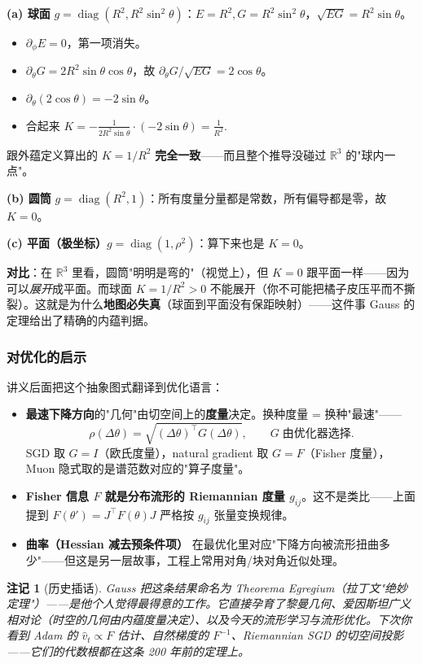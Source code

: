\documentclass[11pt,a4paper]{article}
\theoremstyle{mythm}
\theoremstyle{mydef}
\newtheorem{remark}[theorem]{注记}
\newcommand{\R}{\mathbb{R}}
\newcommand{\diag}{\operatorname{diag}}
\begin{document}
\textbf{(a) 球面} $g = \diag(R^2, R^2\sin^2\theta)$：$E = R^2, G = R^2\sin^2\theta$，$\sqrt{EG} = R^2\sin\theta$。
\begin{itemize}[leftmargin=2em]
\item $\partial_\phi E = 0$，第一项消失。
\item $\partial_\theta G = 2R^2\sin\theta\cos\theta$，故 $\partial_\theta G / \sqrt{EG} = 2\cos\theta$。
\item $\partial_\theta(2\cos\theta) = -2\sin\theta$。
\item 合起来 $K = -\frac{1}{2 R^2\sin\theta}\cdot(-2\sin\theta) = \boxed{\frac{1}{R^2}}.$
\end{itemize}
跟外蕴定义算出的 $K = 1/R^2$ \textbf{完全一致}——而且整个推导没碰过 $\R^3$ 的"球内一点"。

\textbf{(b) 圆筒} $g = \diag(R^2, 1)$：所有度量分量都是常数，所有偏导都是零，故 $K = 0$。

\textbf{(c) 平面（极坐标）}$g = \diag(1, \rho^2)$：算下来也是 $K = 0$。

\medskip
\textbf{对比}：在 $\R^3$ 里看，圆筒"明明是弯的"（视觉上），但 $K = 0$ 跟平面一样——因为可以\emph{展开}成平面。而球面 $K = 1/R^2 > 0$ 不能展开（你不可能把橘子皮压平而不撕裂）。这就是为什么\textbf{地图必失真}（球面到平面没有保距映射）——这件事 Gauss 的定理给出了精确的内蕴判据。

\subsubsection*{对优化的启示}

讲义后面把这个抽象图式翻译到优化语言：
\begin{itemize}[leftmargin=2em]
\item \textbf{最速下降方向}的"几何"由切空间上的\textbf{度量}决定。换种度量 = 换种"最速"——
$$\rho(\Delta\theta) = \sqrt{(\Delta\theta)^\top G(\Delta\theta)},\qquad G\;\text{由优化器选择}.$$
SGD 取 $G = I$（欧氏度量），natural gradient 取 $G = F$（Fisher 度量），Muon 隐式取的是谱范数对应的"算子度量"。
\item \textbf{Fisher 信息 $F$ 就是分布流形的 Riemannian 度量 $g_{ij}$}。这不是类比——上面提到 $F(\theta') = J^\top F(\theta) J$ 严格按 $g_{ij}$ 张量变换规律。
\item \textbf{曲率（Hessian 减去预条件项）} 在最优化里对应"下降方向被流形扭曲多少"——但这是另一层故事，工程上常用对角/块对角近似处理。
\end{itemize}

\begin{remark}[历史插话]
Gauss 把这条结果命名为 \emph{Theorema Egregium}（拉丁文"绝妙定理"）——是他个人觉得最得意的工作。它直接孕育了黎曼几何、爱因斯坦广义相对论（时空的几何由内蕴度量决定）、以及今天的流形学习与流形优化。下次你看到 Adam 的 $\hat v_t \propto F$ 估计、自然梯度的 $F^{-1}$、Riemannian SGD 的切空间投影——它们的代数根都在这条 200 年前的定理上。
\end{remark}
\end{document}
